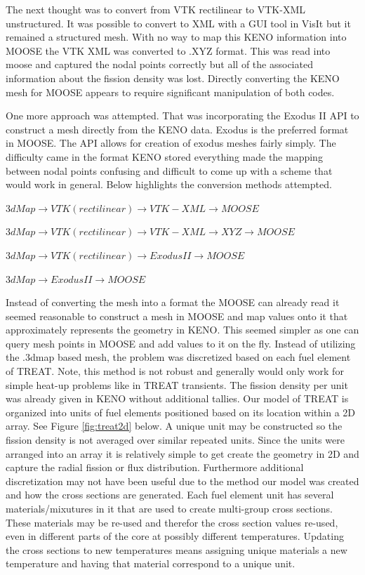 \documentclass[11pt]{article}
\begin{document}
The next thought was to convert from VTK rectilinear to VTK-XML unstructured.  It was possible to convert to XML with a GUI tool in VisIt but it remained a structured mesh.  With no way to map this KENO information into MOOSE the VTK XML was converted to .XYZ format.  This was read into moose and captured the nodal points correctly but all of the associated information about the fission density was lost. Directly converting the KENO mesh for MOOSE appears to require significant manipulation of both codes.

One more approach was attempted. That was incorporating the Exodus II API to construct a mesh directly from the KENO data.  Exodus is the preferred format in MOOSE.  The API allows for creation of exodus meshes fairly simply.  The difficulty came in the format KENO stored everything made the mapping between nodal points confusing and difficult to come up with a scheme that would work in general.  
Below highlights the conversion methods attempted.

$3dMap \rightarrow VTK (rectilinear) \rightarrow VTK-XML \rightarrow MOOSE$

$3dMap \rightarrow VTK (rectilinear) \rightarrow VTK-XML \rightarrow XYZ \rightarrow MOOSE$

$3dMap \rightarrow VTK (rectilinear) \rightarrow Exodus II\rightarrow MOOSE$

$3dMap \rightarrow Exodus II \rightarrow MOOSE$

Instead of converting the mesh into a format the MOOSE can already read it seemed reasonable to construct a mesh in MOOSE and map values onto it that approximately represents the geometry in KENO.  This seemed simpler as one can query mesh points in MOOSE and add values to it on the fly.  Instead of utilizing the .3dmap based mesh, the problem was discretized based on each fuel element of TREAT.  Note, this method is not robust and generally would only work for simple heat-up problems like in TREAT transients.  The fission density per unit was already given in KENO without additional tallies.  Our model of TREAT is organized into units of fuel elements positioned based on its location within a 2D array. See Figure \ref{fig:treat2d} below.  A unique unit may be constructed so the fission density is not averaged over similar repeated units.  Since the units were arranged into an array it is relatively simple to get create the geometry in 2D and capture the radial fission or flux distribution.  Furthermore additional discretization may not have been useful due to the method our model was created and how the cross sections are generated.  Each fuel element unit has several materials/mixutures in it that are used to create multi-group cross sections. These materials may be re-used and therefor the cross section values re-used, even in different parts of the core at possibly different temperatures.  Updating the cross sections to new temperatures means assigning unique materials a new temperature and having that material correspond to a unique unit.  
\end{document}
